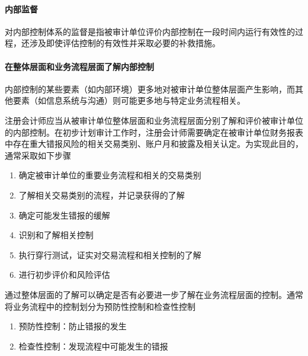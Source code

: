 \documentclass[UTF8,12pt]{ctexart}
\numberwithin{equation}{section} %
\numberwithin{figure}{section}
\numberwithin{table}{section}
\begin{document}
	\paragraph{内部监督}
	对内部控制体系的监督是指被审计单位评价内部控制在一段时间内运行有效性的过程，还涉及即使评估控制的有效性并采取必要的补救措施。
	
	\paragraph{在整体层面和业务流程层面了解内部控制}
	内部控制的某些要素（如内部环境）更多地对被审计单位整体层面产生影响，而其他要素（如信息系统与沟通）则可能更多地与特定业务流程相关。
	
	注册会计师应当从被审计单位整体层面和业务流程层面分别了解和评价被审计单位的内部控制。在初步计划审计工作时，注册会计师需要确定在被审计单位财务报表中存在重大错报风险的相关交易类别、账户月和披露及相关认定。为实现此目的，通常采取如下步骤
	\begin{enumerate}
		\item 确定被审计单位的重要业务流程和相关的交易类别
		
		\item 了解相关交易类别的流程，并记录获得的了解
		
		\item 确定可能发生错报的缓解
		
		\item 识别和了解相关控制
		
		\item 执行穿行测试，证实对交易流程和相关控制的了解
		
		\item 进行初步评价和风险评估
	\end{enumerate}
	
	通过整体层面的了解可以确定是否有必要进一步了解在业务流程层面的控制。通常将业务流程中的控制划分为预防性控制和检查性控制
	\begin{enumerate}
		\item 预防性控制：防止错报的发生
		
		\item 检查性控制：发现流程中可能发生的错报
	\end{enumerate}
	
\end{document}
